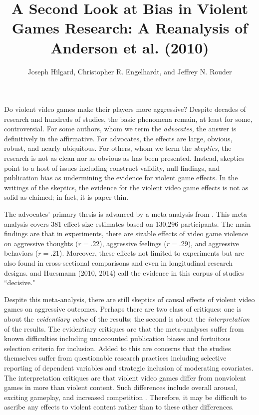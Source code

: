 \documentclass[man]{apa6}
\author{Joseph Hilgard, Christopher R. Engelhardt, and Jeffrey N. Rouder}
\title{A Second Look at Bias in Violent Games Research: A Reanalysis of Anderson et al. (2010)}
\affiliation{University of Missouri}
\begin{document}
\maketitle


Do violent video games make their players more aggressive? Despite decades of research and hundreds of studies, the basic phenomena remain, at least for some, controversial.  For some authors, whom we term the {\em advocates}, the answer is definitively in the affirmative.  For advocates, the effects are large, obvious, robust, and nearly ubiquitous.  For others, whom we term the {\em skeptics}, the research is not as clean nor as obvious as has been presented.  Instead, skeptics point to a host of issues including construct validity, null findings, and publication bias as undermining the evidence for violent game effects.  In the writings of the skeptics, the evidence for the violent video game effects is not as solid as claimed; in fact, it is paper thin.

The advocates' primary thesis is advanced by a meta-analysis from \citep{Anderson:etal:2010}.  This meta-analysis covers 381 effect-size estimates based on 130,296 participants.  The main findings are that in experiments, there are sizable effects of video game violence on aggressive thoughts ($r = .22$),  aggressive feelings ($r = .29$), and aggressive behaviors ($r = .21$).  Moreover, these effects not limited to experiments but are also found in cross-sectional comparisons and even in longitudinal research designs. \citet{Bushman:etal:2010} and Huesmann (2010, 2014) call the evidence in this corpus of studies ``decisive."

Despite this meta-analysis, there are still skeptics of causal effects of violent video games on aggressive outcomes.  Perhaps there are two class of critiques: one is about the {\em evidentiary value} of the results; the second is about the {\em interpretation} of the results.   The evidentiary critiques are that the meta-analyses suffer from known difficulties including unaccounted publication biases and fortuitous selection criteria for inclusion.  Added to this are concerns that the studies themselves suffer from questionable research practices including selective reporting of dependent variables and strategic inclusion of moderating covariates.   The interpretation critiques are that violent video games differ from nonviolent games in more than violent content.  Such differences include overall arousal, exciting gameplay, and increased competition \citep{Adachi:Willoughby:2011,Elson:etal:2013}.  Therefore, it may be difficult to ascribe any effects to violent content rather than to these other differences.   
\end{document}
